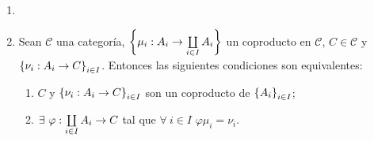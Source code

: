 \documentclass{article}
\begin{document}
\begin{enumerate}[label=\textbf{Ej \arabic*.}]
\begin{proof}
			Para la necesidad comencemos notando que $C$ también es un objeto de $\opst{\mathscr{C}}$. Sean $A$ y $\lrbrack{\catarrow{\opst{\gamma}_i}{A}{A_i}{}}_{\copyandpaste}$ en $\opst{\mathscr{C}}$, luego $A$ es un objeto de $\mathscr{C}$ y $\lrbrack{\catarrow{{\gamma}_i}{A_i}{A}{}}$ es una familia de morfismos en $\mathscr{C}$, con lo cual por la propiedad universal del coproducto $\exists !$ $\catarrow{\alpha}{C}{A}{}$ tal que $\forall\ i\in I$ $\gamma_i=\alpha\mu_i$ en $\mathscr{C}$. De modo que $\opst{\alpha}$ satisface que $\opst{\alpha}\in\ringmodhom{\opst{\mathscr{C}}}{A}{C}$ y $\forall\ \copyandpaste$ $\opst{\gamma}_i=\opst{\mu_i}\opst{\alpha}$. Finalmente, si suponemos que $\catarrow{\opst{\beta}}{A}{C}{}$ satisface que $\forall\ \copyandpaste$ $\opst{\gamma}_i=\opst{\mu_i}\opst{\beta}$, entonces $\beta\in\ringmodhom{\mathscr{C}}{C}{A}$ y $\forall\ \copyandpaste$ $\gamma=\beta\mu_i$. De esto último y la unicidad de $\alpha$ se sigue que ${\beta}={\alpha}$ en $\mathscr{C}$, y así  $\opst{\beta}=\opst{\alpha}$ en $\opst{\mathscr{C}}$, con lo cual se tiene lo dseeado.
			
			La suficiencia se verifica en forma análoga, puesto que tomar una familia de morfismos en la categoría $\mathscr{C}$ induce una familia de morfismos en $\opst{\mathscr{C}}$, empleando ahora la propiedad universal del producto.\\
		\end{proof}
		\item 

		\item Sean $\mathscr{C}$ una categoría, $\lrbrack{\catarrow{\mu_i}{A_i}{\coprod\limits_{i\in I}A_i}{}}$ un coproducto en $\mathscr{C}$, $C\in\mathscr{C}$ y $\lrbrack{\catarrow{\nu_i}{A_i}{C}{C}}_{\copyandpaste}$. Entonces las siguientes condiciones son equivalentes:
		\begin{enumerate}[label=\textit{\alph*)}]
			\item $C$ y $\lrbrack{\catarrow{\nu_i}{A_i}{C}{C}}_{\copyandpaste}$ son un coproducto de $\left\{A_i\right\}_{i\in I}$;
			\item $\exists\ \catarrow{\varphi}{\coprod\limits_{i\in I}A_i}{C}{i}$ tal que $\forall\ i\in I$ $\varphi\mu_i=\nu_i$.
		\end{enumerate}
	\end{enumerate}		
\end{document}
